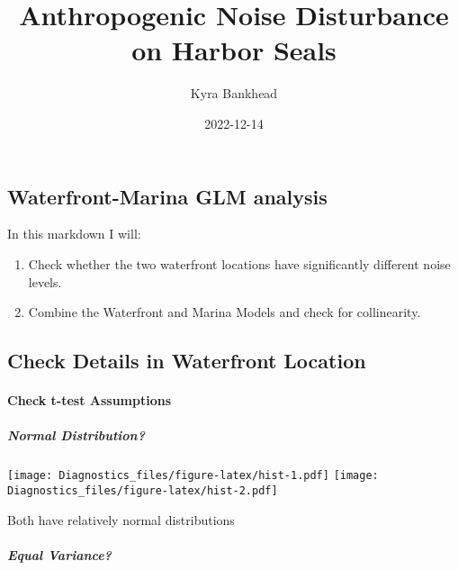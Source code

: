 \documentclass[
]{article}
\title{Anthropogenic Noise Disturbance on Harbor Seals}
\author{Kyra Bankhead}
\date{2022-12-14}
\newenvironment{Shaded}{\begin{snugshade}}{\end{snugshade}}
\newcommand{\CommentTok}[1]{\textcolor[rgb]{0.56,0.35,0.01}{\textit{#1}}}
\newcommand{\DecValTok}[1]{\textcolor[rgb]{0.00,0.00,0.81}{#1}}
\newcommand{\FunctionTok}[1]{\textcolor[rgb]{0.00,0.00,0.00}{#1}}
\newcommand{\NormalTok}[1]{#1}
\newcommand{\OtherTok}[1]{\textcolor[rgb]{0.56,0.35,0.01}{#1}}
\newcommand{\SpecialCharTok}[1]{\textcolor[rgb]{0.00,0.00,0.00}{#1}}
\newcommand{\StringTok}[1]{\textcolor[rgb]{0.31,0.60,0.02}{#1}}
\begin{document}
\maketitle

\hypertarget{waterfront-marina-glm-analysis}{%
\subsection{Waterfront-Marina GLM
analysis}\label{waterfront-marina-glm-analysis}}

In this markdown I will:

\begin{enumerate}
\def\labelenumi{\arabic{enumi}.}
\item
  Check whether the two waterfront locations have significantly
  different noise levels.
\item
  Combine the Waterfront and Marina Models and check for collinearity.
\end{enumerate}

\hypertarget{check-details-in-waterfront-location}{%
\subsection{Check Details in Waterfront
Location}\label{check-details-in-waterfront-location}}

\hypertarget{check-t-test-assumptions}{%
\paragraph{Check t-test Assumptions}\label{check-t-test-assumptions}}

\hypertarget{normal-distribution}{%
\subparagraph{Normal Distribution?}\label{normal-distribution}}

\texttt{[image: Diagnostics\_files/figure-latex/hist-1.pdf]}
\texttt{[image: Diagnostics\_files/figure-latex/hist-2.pdf]}

Both have relatively normal distributions

\hypertarget{equal-variance}{%
\subparagraph{Equal Variance?}\label{equal-variance}}

\begin{Shaded}
\end{Shaded}
\end{document}
